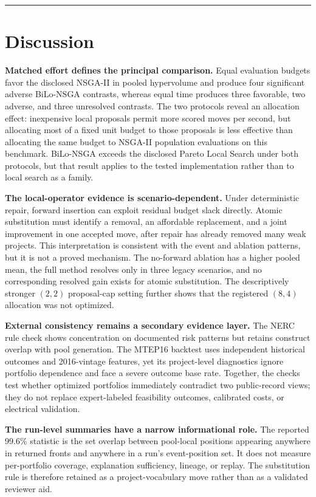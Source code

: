 \documentclass[applsci,article,submit,moreauthors]{Definitions/mdpi}
\begin{document}
\begin{center}\rule{0.5\linewidth}{0.5pt}\end{center}

\section{Discussion}\label{discussion}

\textbf{Matched effort defines the principal comparison.} Equal evaluation budgets favor the disclosed NSGA-II in pooled hypervolume and produce four significant adverse BiLo-NSGA contrasts, whereas equal time produces three favorable, two adverse, and three unresolved contrasts. The two protocols reveal an allocation effect: inexpensive local proposals permit more scored moves per second, but allocating most of a fixed unit budget to those proposals is less effective than allocating the same budget to NSGA-II population evaluations on this benchmark. BiLo-NSGA exceeds the disclosed Pareto Local Search under both protocols, but that result applies to the tested implementation rather than to local search as a family.

\textbf{The local-operator evidence is scenario-dependent.} Under deterministic repair, forward insertion can exploit residual budget slack directly. Atomic substitution must identify a removal, an affordable replacement, and a joint improvement in one accepted move, after repair has already removed many weak projects. This interpretation is consistent with the event and ablation patterns, but it is not a proved mechanism. The no-forward ablation has a higher pooled mean, the full method resolves only in three legacy scenarios, and no corresponding resolved gain exists for atomic substitution. The descriptively stronger \((2,2)\) proposal-cap setting further shows that the registered \((8,4)\) allocation was not optimized.

\textbf{External consistency remains a secondary evidence layer.} The NERC rule check shows concentration on documented risk patterns but retains construct overlap with pool generation. The MTEP16 backtest uses independent historical outcomes and 2016-vintage features, yet its project-level diagnostics ignore portfolio dependence and face a severe outcome base rate. Together, the checks test whether optimized portfolios immediately contradict two public-record views; they do not replace expert-labeled feasibility outcomes, calibrated costs, or electrical validation.

\textbf{The run-level summaries have a narrow informational role.} The reported 99.6\% statistic is the set overlap between pool-local positions appearing anywhere in returned fronts and anywhere in a run's event-position set. It does not measure per-portfolio coverage, explanation sufficiency, lineage, or replay. The substitution rule is therefore retained as a project-vocabulary move rather than as a validated reviewer aid.
\end{document}
